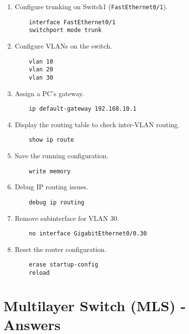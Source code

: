 \documentclass[a4paper]{book}
\begin{document}
\begin{enumerate}
    \item Configure trunking on Switch1 (\texttt{FastEthernet0/1}).
    \begin{lstlisting}
    interface FastEthernet0/1
    switchport mode trunk
    \end{lstlisting}

    \item Configure VLANs on the switch.
    \begin{lstlisting}
    vlan 10
    vlan 20
    vlan 30
    \end{lstlisting}

    \item Assign a PC's gateway.
    \begin{lstlisting}
    ip default-gateway 192.168.10.1
    \end{lstlisting}

    \item Display the routing table to check inter-VLAN routing.
    \begin{lstlisting}
    show ip route
    \end{lstlisting}

    \item Save the running configuration.
    \begin{lstlisting}
    write memory
    \end{lstlisting}

    \item Debug IP routing issues.
    \begin{lstlisting}
    debug ip routing
    \end{lstlisting}

    \item Remove subinterface for VLAN 30.
    \begin{lstlisting}
    no interface GigabitEthernet0/0.30
    \end{lstlisting}

    \item Reset the router configuration.
    \begin{lstlisting}
    erase startup-config
    reload
    \end{lstlisting}
\end{enumerate}

\newpage

\chapter{Multilayer Switch (MLS) - Answers}
\end{document}
